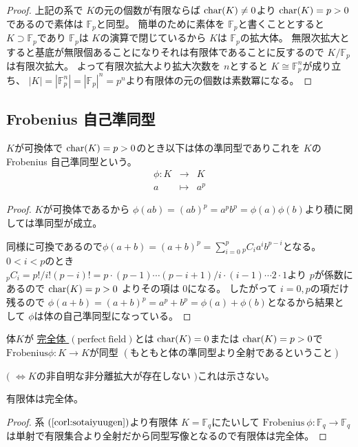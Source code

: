 \documentclass[../master_galois_theory]{subfiles}
\begin{document}
\begin{proof}
  上記の系で $K$の元の個数が有限ならば $\mathrm{char}(K) \neq 0$より $\mathrm{char}(K) = p > 0$
  であるので素体は $\mathbb{F}_p$と同型。
  簡単のために素体を $\mathbb{F}_p$と書くこととすると $K \supset \mathbb{F}_p$であり $\mathbb{F}_p$は $K$の演算で閉じているから $K$は $\mathbb{F}_p$の拡大体。
  無限次拡大とすると基底が無限個あることになりそれは有限体であることに反するので $K/\mathbb{F}_p$は有限次拡大。
  よって有限次拡大より拡大次数を $n$とすると $K \cong \mathbb{F}_p^n$が成り立ち、
  $|K| = |\mathbb{F}_p^n| = |\mathbb{F}_p|^n = p^n$より有限体の元の個数は素数冪になる。
\end{proof}

\subsection{Frobenius 自己準同型}

\begin{defi}
  $K$が可換体で $\mathrm{char}(K) = p > 0$のとき以下は体の準同型でありこれを $K$の \rm{Frobenius} 自己準同型という。
  \begin{eqnarray*}
    \phi : K & \longrightarrow & K \\
    a & \longmapsto & a^p
  \end{eqnarray*}
\end{defi}

\begin{proof}
  $K$が可換体であるから
  $\phi(ab) = (ab)^p = a^p b^p = \phi(a)\phi(b)$より積に関しては準同型が成立。

  同様に可換であるので$\phi(a + b) = (a + b)^p = \sum_{i = 0}^p {}_p C_i a^i b^{p-i}$となる。
  $0 < i < p$のとき ${}_p C_i = p! / i!(p-i)! = p \cdot (p-1) \cdots (p-i+1) / i \cdot (i-1) \cdots 2 \cdot 1$より $p$が係数にあるので $\mathrm{char}(K) = p > 0$
  よりその項は $0$になる。
  したがって $i = 0 , p$の項だけ残るので $\phi(a + b) = (a + b)^p = a^p + b^p = \phi(a) + \phi(b)$となるから結果として $\phi$は体の自己準同型になっている。
\end{proof}

\begin{defi}
  体$K$が \underline{完全体 $(\mathrm{perfect \  field})$}とは
  $\mathrm{char}(K) = 0$または $\mathrm{char}(K) = p > 0$で
  $\mathrm{Frobenius} \phi : K \longrightarrow K$が同型 $(もともと体の準同型より全射であるということ)$

  $($ $\Leftrightarrow K$の非自明な非分離拡大が存在しない $)$これは示さない。
\end{defi}

\begin{prop}
  有限体は完全体。
\end{prop}

\begin{proof}
  系 $(\mathrm{\ref{corl:sotaiyuugen}})$より有限体 $K = \mathbb{F}_q$にたいして $\mathrm{Frobenius} \  \phi : \mathbb{F}_q \longrightarrow \mathbb{F}_q$は単射で有限集合より全射だから同型写像となるので有限体は完全体。
\end{proof}
\end{document}
